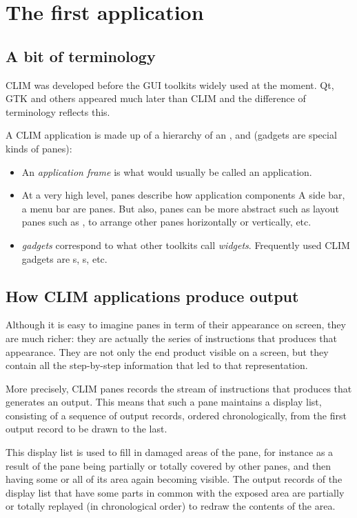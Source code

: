 \chapter{The first application}


\section{A bit of terminology}

CLIM was developed before the GUI toolkits widely used at the moment.
Qt, GTK and others appeared much later than CLIM and the difference of
terminology reflects this.

A CLIM application is made up of a hierarchy of an ,  and  (gadgets are special kinds
of panes):

\begin{itemize}
\item
  An \emph{application frame} is what would usually be called an
  application.
\item
  At a very high level, panes describe how application components A
  side bar, a menu bar are panes. But also, panes can be more abstract
  such as layout panes such as ,  to arrange
  other panes horizontally or vertically, etc.
\item
  \emph{gadgets} correspond to what other toolkits call
  \emph{widgets}.  Frequently used CLIM gadgets are s,
  s, etc.
\end{itemize}


\section{How CLIM applications produce output}

Although it is easy to imagine panes in term of their appearance on
screen, they are much richer: they are actually the series of
instructions that produces that appearance. They are not only the end
product visible on a screen, but they contain all the step-by-step
information that led to that representation.

More precisely, CLIM panes records the stream of instructions that
produces that generates an output.  This means that such a pane
maintains a display list, consisting of a sequence of output records,
ordered chronologically, from the first output record to be drawn to
the last.

This display list is used to fill in damaged areas of the pane, for
instance as a result of the pane being partially or totally covered by
other panes, and then having some or all of its area again becoming
visible.  The output records of the display list that have some parts
in common with the exposed area are partially or totally replayed (in
chronological order) to redraw the contents of the area.

